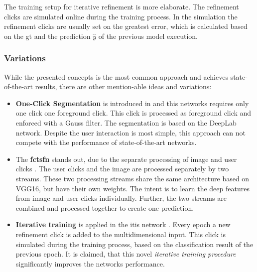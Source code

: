 The training setup for iterative refinement is more elaborate.
The refinement clicks are simulated online during the training process.
In the simulation the refinement clicks are usually set on the greatest error, which is calculated based on the \gls{gt} and the prediction $\hat{y}$ of the previous model execution.

\subsubsection{Variations}
While the presented concepts is the most common approach and achieves state-of-the-art results, there are other mention-able ideas and variations:
\begin{itemize}
	\item \textbf{One-Click Segmentation} is introduced in \cite{Maj20-One-Click} and this networks requires only one click one foreground click.
	This click is processed as foreground click and enforced with a Gauss filter.
	The segmentation is based on the DeepLab network.
	Despite the user interaction is most simple, this approach can not compete with the performance of state-of-the-art networks.
	
	\item The \textbf{\gls{fctsfn}} stands out, due to the separate processing of image and user clicks \cite{Hu19-TwoStreamFusionNetwork}.
	The user clicks and the image are processed separately by two streams.
	These two processing streams share the same architecture based on VGG16, but have their own weights.
	The intent is to learn the deep features from image and user clicks individually.
	Further, the two streams are combined and processed together to create one prediction.
	
	\item \textbf{Iterative training} is applied in the \gls{itis} network \cite{MVL18-ITIS}.
	Every epoch a new refinement click is added to the multidimensional input.
	This click is simulated during the training process, based on the classification result of the previous epoch.
	It is claimed, that this novel \textit{iterative training procedure} significantly improves the networks performance.
	
\end{itemize}


